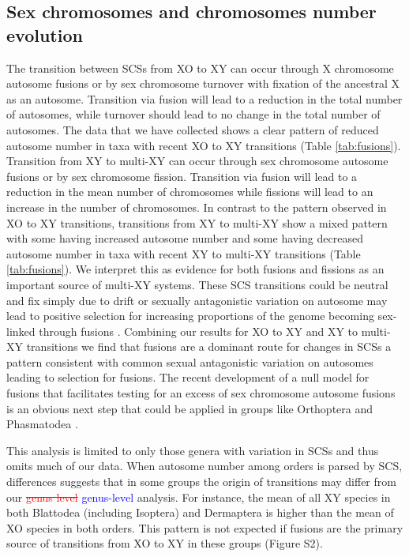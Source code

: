 \documentclass[]{rsos}%
\begin{document}
\subsection{Sex chromosomes and chromosomes number evolution}
The transition between SCSs from XO to XY can occur through X chromosome autosome fusions or by sex chromosome turnover with fixation of the ancestral X as an autosome\textcolor{blue}{\cite{charlesworth1980, white1973, vicoso2015}}. %
Transition via fusion will lead to a reduction in the total number of autosomes, while turnover should lead to no change in the total number of autosomes.
The data that we have collected shows a clear pattern of reduced autosome number in taxa with recent XO to XY transitions (Table \ref{tab:fusions}).
Transition from XY to multi-XY can occur through sex chromosome autosome fusions or by sex chromosome fission.
Transition via fusion will lead to a reduction in the mean number of chromosomes while fissions will lead to an increase in the number of chromosomes.
In contrast to the pattern observed in XO to XY transitions, transitions from XY to multi-XY show a mixed pattern with some having increased autosome number and some having decreased autosome number in taxa with recent XY to multi-XY transitions (Table \ref{tab:fusions}).
We interpret this as evidence for both fusions and fissions as an important source of multi-XY systems.
These SCS transitions could be neutral and fix simply due to drift or sexually antagonistic variation on autosome may lead to positive selection for increasing proportions of the genome becoming sex-linked through fusions \cite{charlesworth1980, kitano2012}.
Combining our results for XO to XY and XY to multi-XY transitions we find that fusions are a dominant route for changes in SCSs a pattern consistent with common sexual antagonistic variation on autosomes leading to selection for fusions. 
The recent development of a null model for fusions that facilitates testing for an excess of sex chromosome autosome fusions is an obvious next step that could be applied in groups like Orthoptera and Phasmatodea \cite{anderson2020}. %

This analysis is limited to only those genera with variation in SCSs and thus omits much of our data.
When autosome number among orders is parsed by SCS, differences suggests that in some groups the origin of transitions may differ from our
\textcolor{red}{\st{genus level}} \textcolor{blue}{genus-level} analysis.
For instance, the mean of all XY species in both Blattodea (including Isoptera) and Dermaptera is higher than the mean of XO species in both orders.
This pattern is not expected if fusions are the primary source of transitions from XO to XY in these groups (Figure S2).
\end{document}

